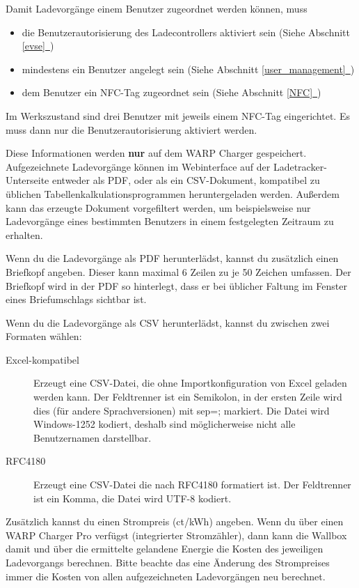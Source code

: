 \documentclass[a4paper,10pt]{article}
\newcommand{\hint}[1]{\begin{tcolorbox}[colback=boxgray,colframe=black,coltext=
white,title=Hinweis,left*=2mm,right*=2mm,boxsep=1mm,bottom=1mm,top=1mm]#1\end{tcolorbox}}
\newcommand*{\fullref}[1]{Abschnitt \hyperref[{#1}]{\ref*{#1}~\nameref*{#1}}}
\begin{document}
\begin{multicols*}{2}
    \vfill
    \null
    \columnbreak

    \hint{Damit Ladevorgänge einem Benutzer zugeordnet werden können, muss
        \begin{itemize}
            \item die Benutzerautorisierung des Ladecontrollers aktiviert sein
            (Siehe \fullref{evse})
            \item mindestens ein Benutzer angelegt sein (Siehe \fullref{user_management})
            \item dem Benutzer ein NFC-Tag zugeordnet sein (Siehe \fullref{NFC})
        \end{itemize}
        Im Werkszustand sind drei Benutzer mit jeweils einem NFC-Tag eingerichtet. Es muss dann nur die Benutzerautorisierung aktiviert werden.
    }

    Diese Informationen werden \textbf{nur} auf dem WARP Charger gespeichert.
    Aufgezeichnete Ladevorgänge können im Webinterface auf der Ladetracker-Unterseite entweder als PDF, oder als ein CSV-Dokument,
    kompatibel zu üblichen Tabellenkalkulationsprogrammen heruntergeladen werden. Außerdem kann das erzeugte Dokument
    vorgefiltert werden, um beispielsweise nur Ladevorgänge eines bestimmten Benutzers in einem festgelegten Zeitraum zu erhalten.

    Wenn du die Ladevorgänge als PDF herunterlädst, kannst du zusätzlich einen Briefkopf angeben. Dieser kann maximal 6 Zeilen zu je 50 Zeichen
    umfassen. Der Briefkopf wird in der PDF so hinterlegt, dass er bei üblicher Faltung im Fenster eines Briefumschlags sichtbar ist.

    Wenn du die Ladevorgänge als CSV herunterlädst, kannst du zwischen zwei Formaten wählen:
    \begin{description}
     \item[Excel-kompatibel] Erzeugt eine CSV-Datei, die ohne Importkonfiguration von Excel geladen werden kann. Der Feldtrenner ist ein Semikolon, in der ersten Zeile wird dies (für andere Sprachversionen) mit sep=; markiert. Die Datei wird Windows-1252 kodiert, deshalb sind möglicherweise nicht alle Benutzernamen darstellbar.
     \item[RFC4180] Erzeugt eine CSV-Datei die nach RFC4180 formatiert ist. Der Feldtrenner ist ein Komma, die Datei wird UTF-8 kodiert.
    \end{description}


    Zusätzlich kannst du einen Strompreis (ct/kWh) angeben. Wenn du über einen
    WARP Charger Pro verfügst (integrierter Stromzähler), dann kann die Wallbox
    damit und über die ermittelte gelandene Energie die Kosten des jeweiligen
    Ladevorgangs berechnen. Bitte beachte das eine Änderung des Strompreises
    immer die Kosten von allen aufgezeichneten Ladevorgängen neu berechnet.


\end{multicols*}
\end{document}
